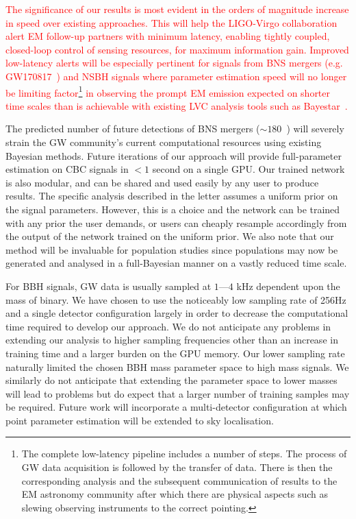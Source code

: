 %
%
\textcolor{red}{
The significance of our results is most evident in the orders of magnitude
increase in speed over existing approaches. This will help the
LIGO-Virgo collaboration alert \ac{EM} follow-up partners with minimum latency, 
enabling tightly coupled, closed-loop control of sensing resources, for maximum information gain.
Improved low-latency alerts will be especially pertinent for signals from
\ac{BNS} mergers (e.g. GW170817~\cite{PhysRevLett.119.161101}) and \ac{NSBH} signals where
parameter estimation speed will no longer be limiting factor\footnote{The complete
low-latency pipeline includes a number of steps. The process of \ac{GW} data
acquisition is followed by the transfer of data. There is then the corresponding
analysis and the subsequent communication of results to the \ac{EM} astronomy
community after which there are physical aspects such as slewing observing
instruments to the correct pointing.} in observing the prompt \ac{EM} emission
expected on shorter time scales than is achievable with existing \ac{LVC}
analysis tools such as Bayestar~\cite{2016PhRvD..93b4013S}.}

%
%
The predicted number of future detections of \ac{BNS} mergers ($\sim
180$~\cite{2018LRR....21....3A}) will severely strain the \ac{GW} community's
current computational resources using existing Bayesian methods. Future
iterations of our approach will provide full-parameter estimation on \ac{CBC}
signals in $<1$ second on a single \ac{GPU}. Our trained network is also
modular, and can be shared and used easily by any user to produce results. The
specific analysis described in the letter assumes a uniform prior on the signal
parameters. However, this is a choice and the network can be trained with any
prior the user demands, or users can cheaply resample accordingly from the
output of the network trained on the uniform prior. We also note that our
method will be invaluable for population studies since populations may now be
generated and analysed in a full-Bayesian manner on a vastly reduced time
scale. 

%
%
For \ac{BBH} signals, \ac{GW} data is usually sampled at $1$---$4$ kHz
dependent upon the mass of binary. We have chosen to use the noticeably low
sampling rate of 256Hz and a single detector configuration largely in order to
decrease the computational time required to develop our approach. We do not
anticipate any problems in extending our analysis to higher sampling
frequencies other than an increase in training time and a larger burden on the
\ac{GPU} memory. Our lower sampling rate naturally limited the chosen \ac{BBH}
mass parameter space to high mass signals. We similarly do not anticipate that
extending the parameter space to lower masses will lead to problems but do
expect that a larger number of training samples may be required. Future work
will incorporate a multi-detector configuration at which point parameter
estimation will be extended to sky localisation. 

